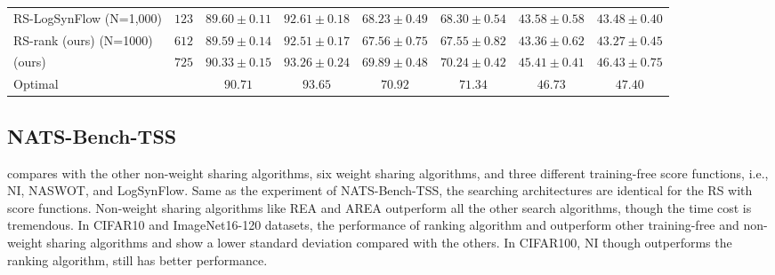 \documentclass[sigconf]{acmart}
\begin{document}
\begin{table*}[htb]
\begin{tabular}{@{}lccccccc@{}}
        RS-LogSynFlow (N=1,000) & $123$& $89.60 \pm 0.11$ & $92.61 \pm 0.18$ & $68.23 \pm 0.49$ & $68.30 \pm 0.54$  & $43.58 \pm 0.58$ & $43.48 \pm 0.40$ \\ 
        RS-rank (ours) (N=1000) & $612$& $89.59 \pm 0.14$ & $92.51 \pm 0.17$ & $67.56 \pm 0.75$ & $67.55 \pm 0.82$  & $43.36 \pm 0.62$ & $43.27 \pm 0.45$ \\ 
        \palg{} (ours)          & $725$& $90.33 \pm 0.15$ & $93.26 \pm 0.24$ & $69.89 \pm 0.48$ & $70.24 \pm 0.42$  & $45.41 \pm 0.41$ & $46.43 \pm 0.75$ \\ \midrule
        Optimal             &          & $90.71$          & $93.65$          & $70.92$          & $71.34$           & $46.73$          & $47.40$          \\ \bottomrule
        \end{tabular}
        \label{table:overall_sss}
          \vspace{-\baselineskip}
    \end{table*}

    \subsection{NATS-Bench-TSS}
     compares \palg{} with the other non-weight sharing algorithms, six 
    weight sharing algorithms, and three different training-free score functions, i.e., NI, NASWOT, and 
    LogSynFlow. Same as the experiment of NATS-Bench-TSS, the searching architectures are identical 
    for the RS with score functions. Non-weight sharing algorithms like REA and AREA outperform all 
    the other search algorithms, though the time cost is tremendous. In CIFAR10 and ImageNet16-120 datasets, 
    the performance of ranking algorithm and \palg{} outperform other training-free and non-weight sharing 
    algorithms and show a lower standard deviation compared with the others. In CIFAR100, 
    NI though outperforms the ranking algorithm, \palg{} still has better performance. 
    
\end{document}
